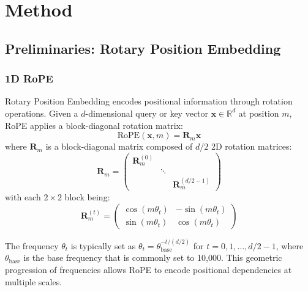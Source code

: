 
\section{Method}
\label{sec:method}


\subsection{Preliminaries: Rotary Position Embedding}

\subsubsection{1D RoPE}

Rotary Position Embedding \cite{suRoFormerEnhancedTransformer2023} encodes positional information through rotation operations. Given a $d$-dimensional query or key vector $\mathbf{x} \in \mathbb{R}^d$ at position $m$, RoPE applies a block-diagonal rotation matrix: 
\begin{equation}
    \text{RoPE}(\mathbf{x}, m) = \mathbf{R}_m \mathbf{x}
\end{equation}
where $\mathbf{R}_m$ is a block-diagonal matrix composed of $d/2$ 2D rotation matrices:
\begin{equation}
    \mathbf{R}_m = \begin{pmatrix}
        \mathbf{R}_m^{(0)} & & \\
        & \ddots & \\
        & & \mathbf{R}_m^{(d/2-1)}
    \end{pmatrix}
\end{equation}
with each $2 \times 2$ block being:
\begin{equation}
    \mathbf{R}_m^{(t)} = \begin{pmatrix}
        \cos(m\theta_t) & -\sin(m\theta_t) \\
        \sin(m\theta_t) & \cos(m\theta_t)
    \end{pmatrix}
\end{equation}

The frequency $\theta_t$ is typically set as $\theta_t = \theta_{\text{base}}^{-t/(d/2)}$ for $t = 0, 1, \ldots, d/2-1$, where $\theta_{\text{base}}$ is the base frequency that is commonly set to 10,000. This geometric progression of frequencies allows RoPE to encode positional dependencies at multiple scales.

